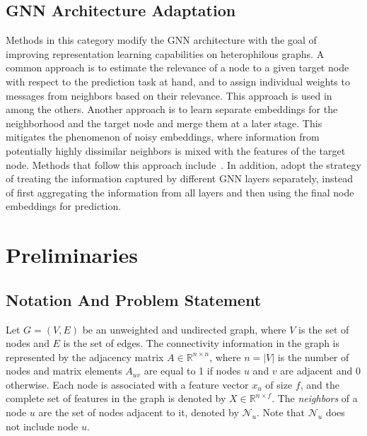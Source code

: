 \documentclass[conference]{IEEEtran}
\begin{document}
\subsection{GNN Architecture Adaptation}
Methods in this category modify the GNN architecture with the goal of improving representation learning capabilities on heterophilous graphs. A common approach is to estimate the relevance of a node to a given target node with respect to the prediction task at hand, and to assign individual weights to messages from neighbors based on their relevance. This approach is used in~\cite{yan_two_2021,bodnar_neural_2022,bo_beyond_2021,du_gbk_2022,yang_diverse_2021} among the others. Another approach is to learn separate embeddings for the neighborhood and the target node and merge them at a later stage. This mitigates the phenomenon of noisy embeddings, where information from potentially highly dissimilar neighbors is mixed with the features of the target node. Methods that follow this approach include~\cite{zhu_beyond_2020,suresh_breaking_2021}. 
In addition, \cite{zhu_beyond_2020,chen_simple_2020,chien_adaptive_2021} adopt the strategy of treating the information captured by different GNN layers separately, instead of first aggregating the information from all layers and then using the final node embeddings for prediction.


\section{Preliminaries}
\subsection{Notation And Problem Statement}
Let \(G = (V,E)\) be an unweighted and undirected graph, where \(V\) is the set of nodes and \(E\) is the set of edges. The connectivity information in the graph is represented by the adjacency matrix \(A\in \mathbb{R}^{n\times n}\), where \(n = |V|\) is the number of nodes and matrix elements \(A_{uv}\) are equal to 1 if nodes \(u\) and \(v\) are adjacent and 0 otherwise. Each node is associated with a feature vector \(x_u\) of size \(f\), and the complete set of features in the graph is denoted by \(X\in \mathbb{R}^{n\times f}\). The \textit{neighbors} of a node \(u\) are the set of nodes adjacent to it, denoted by \(\mathcal{N}_u\). Note that \(\mathcal{N}_u\) does not include node $u$.
\end{document}
